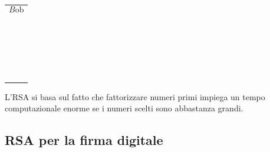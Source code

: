 \documentclass[a4paper,12pt, oneside]{book}
\begin{document}
		\hfill
		\begin{minipage}{0.20\textwidth}
			\begin{tabular}{|p{\textwidth}}
				
				$$B\mbox{ob}$$\\\\\\\\\\\\\\\\\\\\\\\\\\\\\\\\\\\\\\\\\\\\\\
				
			\end{tabular}
		\end{minipage}%
		
		\newpage
		
		\begin{osservazione}
			L'RSA si basa sul fatto che fattorizzare numeri primi impiega un tempo computazionale enorme se i numeri scelti sono abbastanza grandi.
		\end{osservazione}
		
		
		\newpage
		
		\subsection{RSA per la \textbf{firma digitale}}
		
\end{document}

